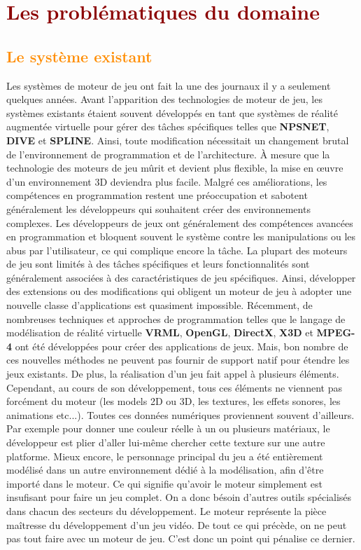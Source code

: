 \documentclass[ebook, 8pt, oneside, openany]{memoir}
\begin{document}
	\section{\textcolor{darkred}{Les problématiques du domaine}}
	\subsection{\textcolor{darkorange}{Le système existant}}
	Les systèmes de moteur de jeu ont fait la une des journaux il y a seulement quelques années. Avant 
	l'apparition des technologies de moteur de jeu, les systèmes existants étaient souvent développés en
	tant que systèmes de réalité augmentée virtuelle pour gérer des tâches spécifiques telles que
	\textbf{NPSNET}, \textbf{DIVE} et \textbf{SPLINE}. Ainsi, toute modification nécessitait un changement
	brutal de l'environnement de programmation et de l'architecture. À mesure que la technologie des moteurs
	de jeu mûrit et devient plus flexible, la mise en œuvre d'un environnement 3D deviendra plus facile.
	Malgré ces améliorations, les compétences en programmation restent une préoccupation et sabotent
	généralement les développeurs qui souhaitent créer des environnements complexes. Les développeurs de
	jeux ont généralement des compétences avancées en programmation et bloquent souvent le système contre
	les manipulations ou les abus par l'utilisateur, ce qui complique encore la tâche. La plupart des
	moteurs de jeu sont limités à des tâches spécifiques et leurs fonctionnalités sont généralement
	associées à des caractéristiques de jeu spécifiques. Ainsi, développer des extensions ou des
	modifications qui obligent un moteur de jeu à adopter une nouvelle classe d'applications est quasiment
	impossible. Récemment, de nombreuses techniques et approches de programmation telles que le langage de
	modélisation de réalité virtuelle \textbf{VRML}, \textbf{OpenGL}, \textbf{DirectX}, \textbf{X3D} et
	\textbf{MPEG-4} ont été développées pour créer des applications de jeux. Mais, bon nombre de ces
	nouvelles méthodes ne peuvent pas fournir de support natif pour étendre les jeux existants. De plus, la
	réalisation d'un jeu fait appel à plusieurs éléments. Cependant, au cours de son développement, tous ces
	éléments ne viennent pas forcément du moteur (les models 2D ou 3D, les textures, les effets sonores, les
	animations etc...). Toutes ces données numériques proviennent souvent d'ailleurs. Par exemple pour
	donner une couleur réelle à un ou plusieurs matériaux, le développeur est plier d'aller lui-même
	chercher cette texture sur une autre platforme. Mieux encore, le personnage principal du jeu a été
	entièrement modélisé dans un autre environnement dédié à la modélisation, afin d'être importé dans le
	moteur. Ce qui signifie qu'avoir le moteur simplement est insufisant pour faire un jeu complet. On a
	donc bésoin d'autres outils spécialisés dans chacun des secteurs du développement. Le moteur représente
	la pièce maîtresse du développement d'un jeu vidéo. De tout ce qui précède, on ne peut pas tout faire
	avec un moteur de jeu. C'est donc un point qui pénalise ce dernier.
\end{document}
